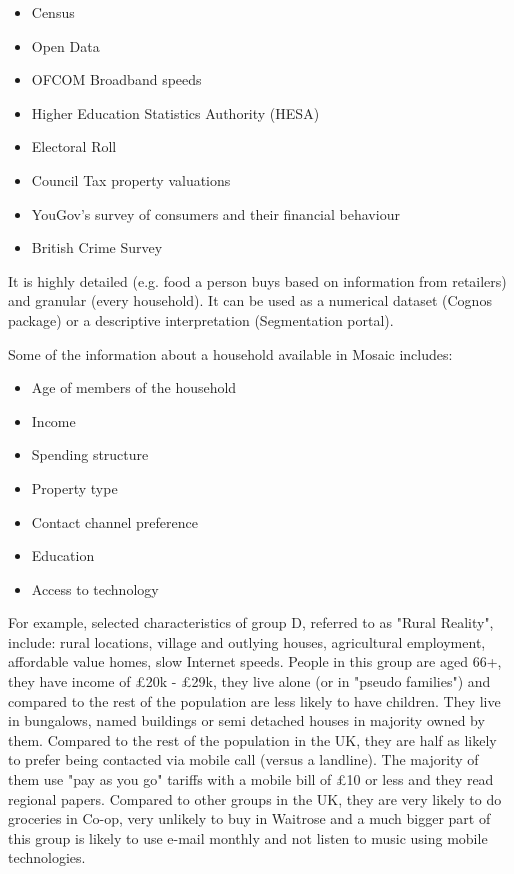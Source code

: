\begin{itemize}
\item Census
\item Open Data
\item OFCOM Broadband speeds
\item Higher Education Statistics Authority (HESA)
\item Electoral Roll
\item Council Tax property valuations
\item YouGov's survey of consumers and their financial behaviour
\item British Crime Survey
\end{itemize}

It is highly detailed (e.g. food a person buys based on information from retailers) and granular (every household). It can be used as a numerical dataset (Cognos package) or a descriptive interpretation (Segmentation portal).

Some of the information about a household available in Mosaic includes:

\begin{itemize}
\item Age of members of the household
\item Income
\item Spending structure
\item Property type
\item Contact channel preference
\item Education
\item Access to technology
\end{itemize}
	
For example, selected characteristics of group D, referred to as "Rural Reality", include: rural locations, village and outlying houses, agricultural employment, affordable value homes, slow Internet speeds. People in this group are aged 66+, they have income of \pounds 20k - \pounds 29k, they live alone (or in "pseudo families") and compared to the rest of the population are less likely to have children. They live in bungalows, named buildings or semi detached houses in majority owned by them. Compared to the rest of the population in the UK, they are half as likely to prefer being contacted via  mobile call (versus a landline). The majority of them use "pay as you go" tariffs with a mobile bill of \pounds 10 or less and they read regional papers. Compared to other groups in the UK, they are very likely to do groceries in Co-op, very unlikely to buy in Waitrose and a much bigger part of this group is likely to use e-mail monthly and not listen to music using mobile technologies. 

